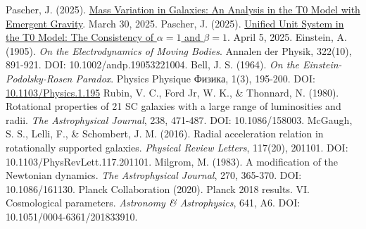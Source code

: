 \documentclass[12pt,a4paper]{article}
\begin{document}
\begin{thebibliography}{99}
		 Pascher, J. (2025). \href{https://github.com/jpascher/T0-Time-Mass-Duality/tree/main/2/pdf/English/Massenvariation\%20in\%20Galaxien_en.pdf}{Mass Variation in Galaxies: An Analysis in the T0 Model with Emergent Gravity}. March 30, 2025.
		 Pascher, J. (2025). \href{https://github.com/jpascher/T0-Time-Mass-Duality/tree/main/2/pdf/English/Die\%20Konsistenz\%20von\%20alpha\%20=\%201\%20und\%20beta\%20=\%201_en.pdf}{Unified Unit System in the T0 Model: The Consistency of \(\alpha = 1\) and \(\beta = 1\)}. April 5, 2025.
		 Einstein, A. (1905). \textit{On the Electrodynamics of Moving Bodies}. Annalen der Physik, 322(10), 891-921. DOI: 10.1002/andp.19053221004.
		 Bell, J. S. (1964). \textit{On the Einstein-Podolsky-Rosen Paradox}. Physics Physique {\selectfont Физика}, 1(3), 195-200. DOI: \href{https://doi.org/10.1103/Physics.1.195}{10.1103/Physics.1.195}
		 Rubin, V. C., Ford Jr, W. K., \& Thonnard, N. (1980). Rotational properties of 21 SC galaxies with a large range of luminosities and radii. \textit{The Astrophysical Journal}, 238, 471-487. DOI: 10.1086/158003.
		 McGaugh, S. S., Lelli, F., \& Schombert, J. M. (2016). Radial acceleration relation in rotationally supported galaxies. \textit{Physical Review Letters}, 117(20), 201101. DOI: 10.1103/PhysRevLett.117.201101.
		 Milgrom, M. (1983). A modification of the Newtonian dynamics. \textit{The Astrophysical Journal}, 270, 365-370. DOI: 10.1086/161130.
		 Planck Collaboration (2020). Planck 2018 results. VI. Cosmological parameters. \textit{Astronomy \& Astrophysics}, 641, A6. DOI: 10.1051/0004-6361/201833910.
	\end{thebibliography}
	
\end{document}
